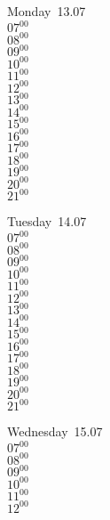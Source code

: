 \documentclass[11pt,a4paper]{book}\usepackage[]{graphicx}\usepackage[]{color}
\begin{document}
{%
%
\begin{tcolorbox}
Monday~13.07\\
{ 
$07^{00}$\\
$08^{00}$\\
$09^{00}$\\
$10^{00}$\\
$11^{00}$\\
$12^{00}$\\
$13^{00}$\\
$14^{00}$\\
$15^{00}$\\
$16^{00}$\\
$17^{00}$\\
$18^{00}$\\
$19^{00}$\\
$20^{00}$\\
$21^{00}$}\\
\end{tcolorbox}
%
\begin{tcolorbox}
Tuesday~14.07\\
{ 
$07^{00}$\\
$08^{00}$\\
$09^{00}$\\
$10^{00}$\\
$11^{00}$\\
$12^{00}$\\
$13^{00}$\\
$14^{00}$\\
$15^{00}$\\
$16^{00}$\\
$17^{00}$\\
$18^{00}$\\
$19^{00}$\\
$20^{00}$\\
$21^{00}$}\\
\end{tcolorbox}
%
\begin{tcolorbox}
Wednesday~15.07\\
{ 
$07^{00}$\\
$08^{00}$\\
$09^{00}$\\
$10^{00}$\\
$11^{00}$\\
$12^{00}$\\
}
\end{tcolorbox}}
\end{document}
